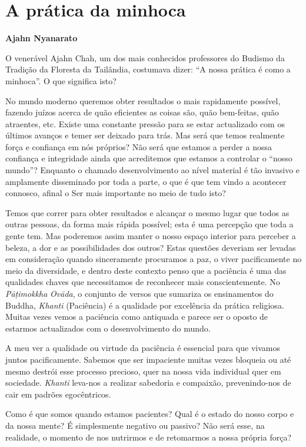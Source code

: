 \chapter{A prática da minhoca}

\textbf{Ajahn Nyanarato}

O venerável Ajahn Chah, um dos mais conhecidos professores do Budismo da
Tradição da Floresta da Tailândia, costumava dizer: ``A nossa prática é
como a minhoca''. O que significa isto?

No mundo moderno queremos obter resultados o mais rapidamente possível,
fazendo juízos acerca de quão eficientes as coisas são, quão bem-feitas,
quão atraentes, etc. Existe uma constante pressão para se estar
actualizado com os últimos avanços e temer ser deixado para trás. Mas
será que temos realmente força e confiança em nós próprios? Não será que
estamos a perder a nossa confiança e integridade ainda que acreditemos
que estamos a controlar o ``nosso mundo''? Enquanto o chamado
desenvolvimento ao nível material é tão invasivo e amplamente
disseminado por toda a parte, o que é que tem vindo a acontecer
connosco, afinal o Ser mais importante no meio de tudo isto?

Temos que correr para obter resultados e alcançar o mesmo lugar que
todos as outras pessoas, da forma mais rápida possível; esta é uma
percepção que toda a gente tem. Mas poderemos assim manter o nosso
espaço interior para perceber a beleza, a dor e as possibilidades dos
outros? Estas questões deveriam ser levadas em consideração quando
sinceramente procuramos a paz, o viver pacificamente no meio da
diversidade, e dentro deste contexto penso que a paciência é uma das
qualidades chaves que necessitamos de reconhecer mais conscientemente.
No \emph{Pāṭimokkha} \emph{Ovāda}, o conjunto de versos que sumariza os
ensinamentos do Buddha, \emph{Khanti} (Paciência) é a qualidade por
excelência da prática religiosa. Muitas vezes vemos a paciência como
antiquada e parece ser o oposto de estarmos actualizados com o
desenvolvimento do mundo.

A meu ver a qualidade ou virtude da paciência é essencial para que
vivamos juntos pacificamente. Sabemos que ser impaciente muitas vezes
bloqueia ou até mesmo destrói esse processo precioso, quer na nossa vida
individual quer em sociedade. \emph{Khanti} leva-nos a realizar
sabedoria e compaixão, prevenindo-nos de cair em padrões egocêntricos.

Como é que somos quando estamos pacientes? Qual é o estado do nosso
corpo e da nossa mente? É simplesmente negativo ou passivo? Não será
esse, na realidade, o momento de nos nutrirmos e de retomarmos a nossa
própria força?


